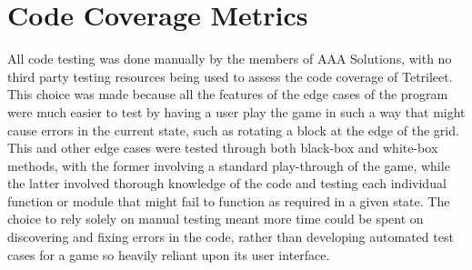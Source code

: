 \documentclass[12pt, titlepage]{article}
\begin{document}
\section{Code Coverage Metrics}

All code testing was done manually by the members of AAA Solutions, with no third party testing resources being used to assess the code coverage of Tetrileet. This choice was made because all the features of the edge cases of the program were much easier to test by having a user play the game in such a way that might cause errors in the current state, such as rotating a block at the edge of the grid. This and other edge cases were tested through both black-box and white-box methods, with the former involving a standard play-through of the game, while the latter involved thorough knowledge of the code and testing each individual function or module that might fail to function as required in a given state. The choice to rely solely on manual testing meant more time could be spent on discovering and fixing errors in the code, rather than developing automated test cases for a game so heavily reliant upon its user interface.




\end{document}
